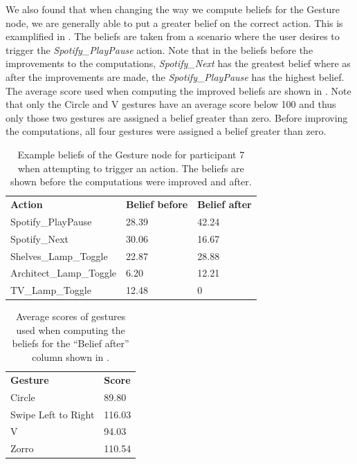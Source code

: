 We also found that when changing the way we compute beliefs for the Gesture node, we are generally able to put a greater belief on the correct action. This is examplified in . The beliefs are taken from a scenario where the user desires to trigger the \emph{Spotify\_PlayPause} action. Note that in the beliefs before the improvements to the computations, \emph{Spotify\_Next} has the greatest belief where as after the improvements are made, the \emph{Spotify\_PlayPause} has the highest belief.
The average score used when computing the improved beliefs are shown in . Note that only the Circle and V gestures have an average score below 100 and thus only those two gestures are assigned a belief greater than zero. Before improving the computations, all four gestures were assigned a belief greater than zero.

\begin{table}[]
\centering
\caption{Example beliefs of the Gesture node for participant 7 when attempting to trigger an action. The beliefs are shown before the computations were improved and after.}
\label{sec:evaluation:alternative-models:improved-action-beliefs}
\begin{tabular}{lll}
\textbf{Action}         & \textbf{Belief before} & \textbf{Belief after} \\
Spotify\_PlayPause      & 28.39                                              & 42.24                                             \\
Spotify\_Next           & 30.06                                              & 16.67                                             \\
Shelves\_Lamp\_Toggle   & 22.87                                              & 28.88                                             \\
Architect\_Lamp\_Toggle & 6.20                                               & 12.21                                             \\
TV\_Lamp\_Toggle        & 12.48                                              & 0                                                 
\end{tabular}
\end{table}

\begin{table}[]
\centering
\caption{Average scores of gestures used when computing the beliefs for the ``Belief after'' column shown in .}
\label{sec:evaluation:alternative-models:improved-gesture-beliefs}
\begin{tabular}{ll}
\textbf{Gesture}    & \textbf{Score} \\
Circle              & 89.80          \\
Swipe Left to Right & 116.03         \\
V                   & 94.03          \\
Zorro               & 110.54         
\end{tabular}
\end{table}

